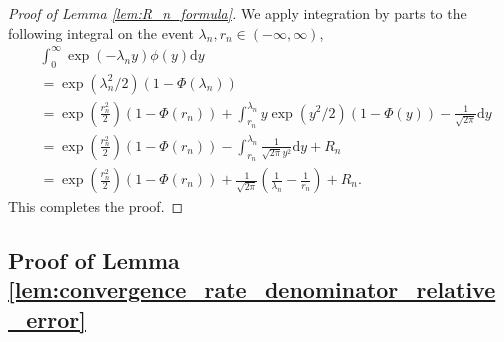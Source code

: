 \documentclass[12pt]{article}
\theoremstyle{definition}
\begin{document}
\begin{proof}[Proof of Lemma \ref{lem:R_n_formula}]
	We apply integration by parts to the following integral on the event $\lambda_n,r_n\in (-\infty,\infty)$,
	\begin{align*}
		&
		\int_{0}^{\infty}\exp(-\lambda_n y)\phi(y)\mathrm{d}y\\
		&
		=\exp(\lambda_n^2/2)(1-\Phi(\lambda_n))\\
		&
		=\exp\left(\frac{r^2_n}{2}\right)(1-\Phi(r_n))
		+\int_{r_n}^{\lambda_n}
		y\exp(y^2/2)(1-\Phi(y))-\frac{1}{\sqrt{2\pi}}
		\mathrm{d}y\\
		&
		=\exp\left(\frac{r^2_n}{2}\right)(1-\Phi(r_n))
		-\int_{r_n}^{\lambda_n}\frac{1}{\sqrt{2\pi}
		y^2}\mathrm{d}y+R_n\\
		&
		=\exp\left(\frac{r^2_n}{2}\right)(1-\Phi(r_n))
		+\frac{1}{\sqrt{2\pi}}\left(\frac{1}{\lambda_n}
		-\frac{1}{r_n}\right)+R_n.
	  \end{align*}
	  This completes the proof.
\end{proof}



\subsection{Proof of Lemma \ref{lem:convergence_rate_denominator_relative_error}}
\end{document}
